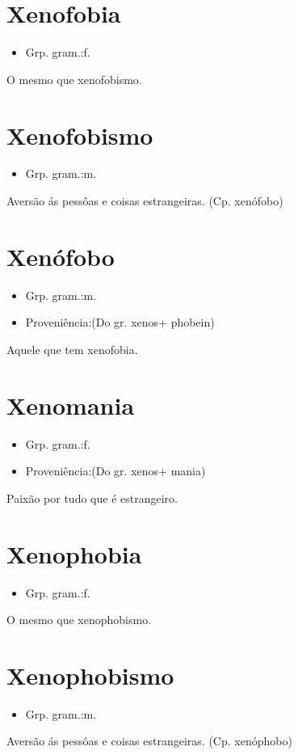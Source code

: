 \section{Xenofobia}
\begin{itemize}
\item {Grp. gram.:f.}
\end{itemize}
O mesmo que \textunderscore xenofobismo\textunderscore .
\section{Xenofobismo}
\begin{itemize}
\item {Grp. gram.:m.}
\end{itemize}
Aversão ás pessôas e coisas estrangeiras.
(Cp. \textunderscore xenófobo\textunderscore )
\section{Xenófobo}
\begin{itemize}
\item {Grp. gram.:m.}
\end{itemize}
\begin{itemize}
\item {Proveniência:(Do gr. \textunderscore xenos\textunderscore  + \textunderscore phobein\textunderscore )}
\end{itemize}
Aquele que tem xenofobia.
\section{Xenomania}
\begin{itemize}
\item {Grp. gram.:f.}
\end{itemize}
\begin{itemize}
\item {Proveniência:(Do gr. \textunderscore xenos\textunderscore  + \textunderscore mania\textunderscore )}
\end{itemize}
Paixão por tudo que é estrangeiro.
\section{Xenophobia}
\begin{itemize}
\item {Grp. gram.:f.}
\end{itemize}
O mesmo que \textunderscore xenophobismo\textunderscore .
\section{Xenophobismo}
\begin{itemize}
\item {Grp. gram.:m.}
\end{itemize}
Aversão ás pessôas e coisas estrangeiras.
(Cp. \textunderscore xenóphobo\textunderscore )
